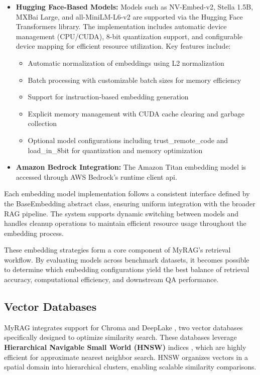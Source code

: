 \documentclass{scrartcl}
\begin{document}
\begin{itemize}
    \item \textbf{Hugging Face-Based Models:} Models such as NV-Embed-v2, Stella 1.5B, MXBai Large, and all-MiniLM-L6-v2 are supported via the Hugging Face Transformers library. The implementation includes automatic device management (CPU/CUDA), 8-bit quantization support, and configurable device mapping for efficient resource utilization. Key features include:
    \begin{itemize}
        \item Automatic normalization of embeddings using L2 normalization
        \item Batch processing with customizable batch sizes for memory efficiency
        \item Support for instruction-based embedding generation
        \item Explicit memory management with CUDA cache clearing and garbage collection
        \item Optional model configurations including trust\_remote\_code and load\_in\_8bit for quantization and memory optimization
    \end{itemize}
    
    \item \textbf{Amazon Bedrock Integration:} The Amazon Titan embedding model is accessed through AWS Bedrock's runtime client api. 
\end{itemize}

Each embedding model implementation follows a consistent interface defined by the BaseEmbedding abstract class, ensuring uniform integration with the broader RAG pipeline. The system supports dynamic switching between models and handles cleanup operations to maintain efficient resource usage throughout the embedding process.

These embedding strategies form a core component of MyRAG's retrieval workflow. By evaluating models across benchmark datasets, it becomes possible to determine which embedding configurations yield the best balance of retrieval accuracy, computational efficiency, and downstream QA performance.


\subsection{Vector Databases}

MyRAG integrates support for Chroma \cite{chroma} and DeepLake \cite{deeplake}, two vector databases specifically designed to optimize similarity search. These databases leverage \textbf{Hierarchical Navigable Small World (HNSW)} indices \cite{malkov2016efficient}, which are highly efficient for approximate nearest neighbor search. HNSW organizes vectors in a spatial domain into hierarchical clusters, enabling scalable similarity comparisons.
\end{document}
